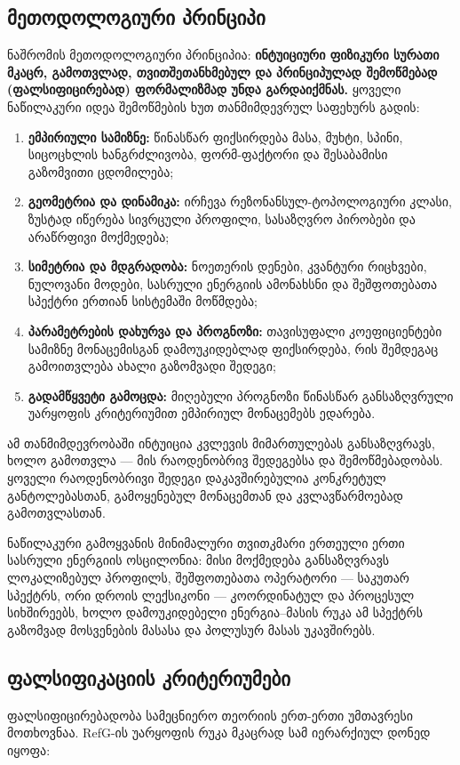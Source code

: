 \documentclass[11pt,a4paper]{article}
\begin{document}
\subsection{მეთოდოლოგიური პრინციპი}

ნაშრომის მეთოდოლოგიური პრინციპია: \textbf{ინტუიციური ფიზიკური სურათი მკაცრ, გამოთვლად, თვითშეთანხმებულ და პრინციპულად შემოწმებად (ფალსიფიცირებად) ფორმალიზმად უნდა გარდაიქმნას.} ყოველი ნაწილაკური იდეა შემოწმების ხუთ თანმიმდევრულ საფეხურს გადის:

\begin{enumerate}[label=\arabic*.]
\item \textbf{ემპირიული სამიზნე:} წინასწარ ფიქსირდება მასა, მუხტი, სპინი, სიცოცხლის ხანგრძლივობა, ფორმ-ფაქტორი და შესაბამისი გაზომვითი ცდომილება;
\item \textbf{გეომეტრია და დინამიკა:} ირჩევა რეზონანსულ-ტოპოლოგიური კლასი, ზუსტად იწერება სივრცული პროფილი, სასაზღვრო პირობები და არაწრფივი მოქმედება;
\item \textbf{სიმეტრია და მდგრადობა:} ნოეთერის დენები, კვანტური რიცხვები, ნულოვანი მოდები, სასრული ენერგიის ამონახსნი და შეშფოთებათა სპექტრი ერთიან სისტემაში მოწმდება;
\item \textbf{პარამეტრების დახურვა და პროგნოზი:} თავისუფალი კოეფიციენტები სამიზნე მონაცემისგან დამოუკიდებლად ფიქსირდება, რის შემდეგაც გამოითვლება ახალი გაზომვადი შედეგი;
\item \textbf{გადამწყვეტი გამოცდა:} მიღებული პროგნოზი წინასწარ განსაზღვრული უარყოფის კრიტერიუმით ემპირიულ მონაცემებს ედარება.

\end{enumerate}
ამ თანმიმდევრობაში ინტუიცია კვლევის მიმართულებას განსაზღვრავს, ხოლო გამოთვლა — მის რაოდენობრივ შედეგებსა და შემოწმებადობას. ყოველი რაოდენობრივი შედეგი დაკავშირებულია კონკრეტულ განტოლებასთან, გამოყენებულ მონაცემთან და კვლავწარმოებად გამოთვლასთან.

ნაწილაკური გამოყვანის მინიმალური თვითკმარი ერთეული ერთი სასრული ენერგიის ოსცილონია: მისი მოქმედება განსაზღვრავს ლოკალიზებულ პროფილს, შეშფოთებათა ოპერატორი — საკუთარ სპექტრს, ორი დროის ლექსიკონი — კოორდინატულ და პროცესულ სიხშირეებს, ხოლო დამოუკიდებელი ენერგია–მასის რუკა ამ სპექტრს გაზომვად მოსვენების მასასა და პოლუსურ მასას უკავშირებს.


\subsection{ფალსიფიკაციის კრიტერიუმები}

ფალსიფიცირებადობა სამეცნიერო თეორიის ერთ-ერთი უმთავრესი მოთხოვნაა. RefG-ის უარყოფის რუკა მკაცრად სამ იერარქიულ დონედ იყოფა:
\end{document}
